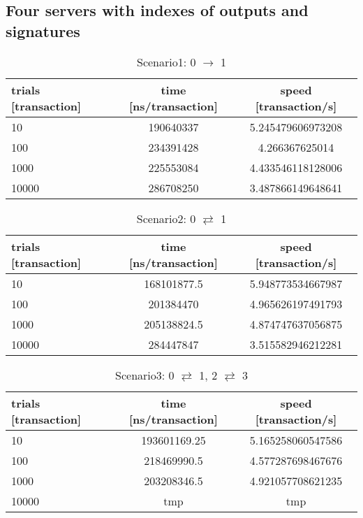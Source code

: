 \documentclass[a4j,11pt,uplatex,onecolumn]{article}
\begin{document}
\subsection{Four servers with indexes of outputs and signatures}
\begin{table}[htb]
  \begin{center}
    \caption{Scenario1: 0 $\rightarrow$ 1}
    \begin{tabular}{|l|c|c|} \hline
        trials [transaction] & time [ns/transaction] & speed [transaction/s]\\ \hline \hline
        10 & 190640337 & 5.245479606973208 \\
        100 & 234391428 & 4.266367625014 \\
        1000 & 225553084 & 4.433546118128006 \\ 
        10000 & 286708250 & 3.487866149648641 \\ \hline
    \end{tabular}
  \end{center}
\end{table}

\begin{table}[htb]
  \begin{center}
    \caption{Scenario2: 0 $\rightleftarrows$ 1}
    \begin{tabular}{|l|c|c|} \hline
        trials [transaction] & time [ns/transaction] & speed [transaction/s]\\ \hline \hline
        10 & 168101877.5 & 5.948773534667987 \\
        100 & 201384470 & 4.965626197491793 \\
        1000 & 205138824.5 & 4.874747637056875 \\
        10000 & 284447847 & 3.515582946212281\\ \hline
    \end{tabular}
  \end{center}
\end{table}

\begin{table}[htb]
  \begin{center}
    \caption{Scenario3: 0 $\rightleftarrows$ 1, 2 $\rightleftarrows$ 3}
    \begin{tabular}{|l|c|c|} \hline
        trials [transaction] & time [ns/transaction] & speed [transaction/s]\\ \hline \hline
        10 & 193601169.25 & 5.165258060547586 \\
        100 & 218469990.5 & 4.577287698467676 \\
        1000 & 203208346.5 & 4.921057708621235 \\
        10000 & tmp & tmp \\ \hline
    \end{tabular}
  \end{center}
\end{table}
\end{document}
